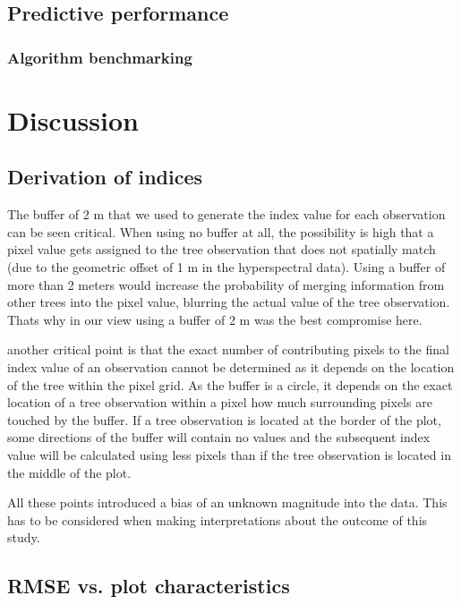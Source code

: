 \documentclass[review]{elsarticle}
\begin{document}
\subsection{Predictive performance}


\subsubsection{Algorithm benchmarking}

\section{Discussion}

\subsection{Derivation of indices}

\noindent The buffer of 2 m that we used to generate the index value for each observation can be seen critical.
When using no buffer at all, the possibility is high that a pixel value gets assigned to the tree observation that does not spatially match (due to the geometric offset of 1 m in the hyperspectral data).
Using a buffer of more than 2 meters would increase the probability of merging information from other trees into the pixel value, blurring the actual value of the tree observation.
Thats why in our view using a buffer of 2 m was the best compromise here.

another critical point is that the exact number of contributing pixels to the final index value of an observation cannot be determined as it depends on the location of the tree within the pixel grid.
As the buffer is a circle, it depends on the exact location of a tree observation within a pixel how much surrounding pixels are touched by the buffer.
If a tree observation is located at the border of the plot, some directions of the buffer will contain no values and the subsequent index value will be calculated using less pixels than if the tree observation is located in the middle of the plot.

All these points introduced a bias of an unknown magnitude into the data.
This has to be considered when making interpretations about the outcome of this study.

\subsection{RMSE vs. plot characteristics}
\end{document}
